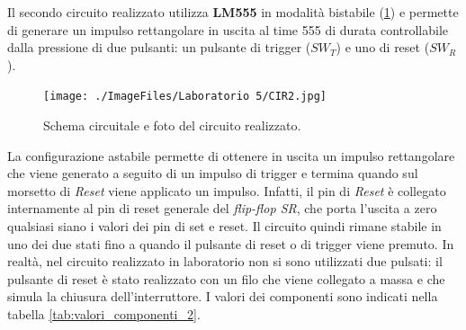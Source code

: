\clearpage
Il secondo circuito realizzato utilizza \textbf{LM555} in modalità bistabile (\Fig\ref{fig:circuito_2}) e permette di generare un impulso rettangolare in uscita al time 555 di durata controllabile dalla pressione di due pulsanti: un pulsante di trigger ($SW_T$) e uno di reset ($SW_R$).
\begin{figure}[h!]
	\centering
	\begin{minipage}{.45\textwidth}
	\end{minipage}\qquad
	\begin{minipage}{.45\textwidth}
		\texttt{[image: ./ImageFiles/Laboratorio 5/CIR2.jpg]}
	\end{minipage}
	\caption{Schema circuitale e foto del circuito realizzato.}
	\label{fig:circuito_2}
\end{figure}
\noindent
La configurazione astabile permette di ottenere in uscita un impulso rettangolare che viene generato a seguito di un impulso di trigger e termina quando sul morsetto di \textit{Reset} viene applicato un impulso. Infatti, il pin di \textit{Reset} è collegato internamente al pin di reset generale del \textit{flip-flop SR}, che porta l'uscita a zero qualsiasi siano i valori dei pin di set e reset. Il circuito quindi rimane stabile in uno dei due stati fino a quando il pulsante di reset o di trigger viene premuto. In realtà, nel circuito realizzato in laboratorio non si sono utilizzati due pulsati: il pulsante di reset è stato realizzato con un filo che viene collegato a massa e che simula la chiusura dell'interruttore. I valori dei componenti sono indicati nella tabella \ref{tab:valori_componenti_2}.
